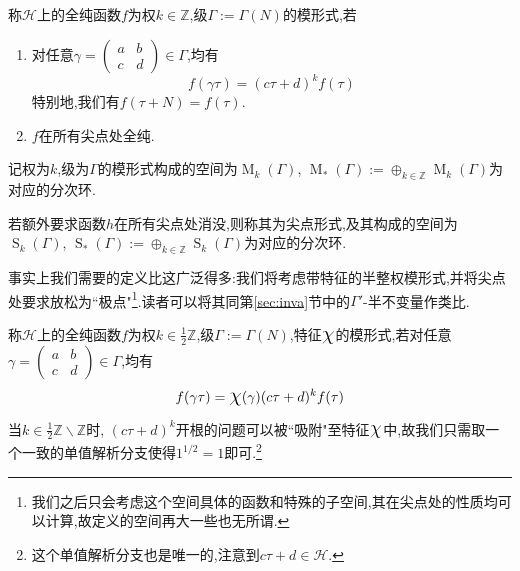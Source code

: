\begin{defn}
	称$\mathcal{H}$上的全纯函数$f$为权$k \in \mathbb{Z}$,级$\Gamma:= \Gamma(N)$的模形式,若
	
	\begin{enumerate}[(1)]
		\item 对任意$\gamma=\begin{pmatrix}
		a & b\\
		c & d
		\end{pmatrix}\in \Gamma$,均有
		\begin{equation}\label{eq:modform2}
		f(\gamma \tau)=(c \tau +d)^k f(\tau)
		\end{equation}
		特别地,我们有$f(\tau+N)=f(\tau)$.
		\item $f$在所有尖点处全纯.
	\end{enumerate}
	记权为$k$,级为$\Gamma$的模形式构成的空间为$\operatorname{M}_k(\Gamma)$, $\operatorname{M}_{*}(\Gamma):= \oplus_{k \in \mathbb{Z}}\operatorname{M}_k(\Gamma)$为对应的分次环.
	
	若额外要求函数$h$在所有尖点处消没,则称其为尖点形式,及其构成的空间为$\operatorname{S}_k(\Gamma)$, $\operatorname{S}_{*}(\Gamma):= \oplus_{k \in \mathbb{Z}}\operatorname{S}_k(\Gamma)$为对应的分次环.
\end{defn}
\begin{remark}
	事实上我们需要的定义比这广泛得多:我们将考虑带特征的半整权模形式,并将尖点处要求放松为``极点"\footnote{我们之后只会考虑这个空间具体的函数和特殊的子空间,其在尖点处的性质均可以计算,故定义的空间再大一些也无所谓.}.读者可以将其同第\ref{sec:inva}节中的$\Gamma'$-半不变量作类比.
\end{remark}
\begin{defn}
	称$\mathcal{H}$上的全纯函数$f$为权$k \in \frac{1}{2}\mathbb{Z}$,级$\Gamma:= \Gamma(N)$,特征$\mbox{\Large$\chi$}$的模形式,若对任意$\gamma=\begin{pmatrix}
	a & b\\
	c & d
	\end{pmatrix}\in \Gamma$,均有
	\begin{equation}\label{eq:modform3}
	f(\gamma \tau)=\mbox{\Large$\chi$}(\gamma)(c \tau +d)^k f(\tau)
	\end{equation}
\end{defn}
\begin{remark}
	当$k \in \frac{1}{2} \mathbb{Z} \smallsetminus \mathbb{Z}$时, $(c\tau+d)^k$开根的问题可以被``吸附"至特征$\mbox{\Large$\chi$}$中,故我们只需取一个一致的单值解析分支使得$1^{1/2}=1$即可.\footnote{这个单值解析分支也是唯一的,注意到$c\tau+d \in \mathcal{H}$.}
\end{remark}




